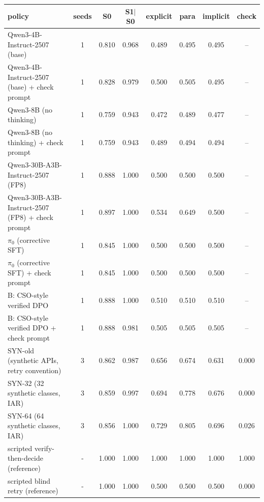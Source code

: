 \begin{tabular}{lccccccc}\toprule
policy & seeds & S0 & S1$|$S0 & explicit & para & implicit & \tautwo{} check\\ \midrule
Qwen3-4B-Instruct-2507 (base) & 1 & 0.810 & 0.968 & 0.489 & 0.495 & 0.495 & --\\
Qwen3-4B-Instruct-2507 (base) + check prompt & 1 & 0.828 & 0.979 & 0.500 & 0.505 & 0.495 & --\\
Qwen3-8B (no thinking) & 1 & 0.759 & 0.943 & 0.472 & 0.489 & 0.477 & --\\
Qwen3-8B (no thinking) + check prompt & 1 & 0.759 & 0.943 & 0.489 & 0.494 & 0.494 & --\\
Qwen3-30B-A3B-Instruct-2507 (FP8) & 1 & 0.888 & 1.000 & 0.500 & 0.500 & 0.500 & --\\
Qwen3-30B-A3B-Instruct-2507 (FP8) + check prompt & 1 & 0.897 & 1.000 & 0.534 & 0.649 & 0.500 & --\\
$\pi_0$ (corrective SFT) & 1 & 0.845 & 1.000 & 0.500 & 0.500 & 0.500 & --\\
$\pi_0$ (corrective SFT) + check prompt & 1 & 0.845 & 1.000 & 0.500 & 0.500 & 0.500 & --\\
B: CSO-style verified DPO & 1 & 0.888 & 1.000 & 0.510 & 0.510 & 0.510 & --\\
B: CSO-style verified DPO + check prompt & 1 & 0.888 & 0.981 & 0.505 & 0.505 & 0.505 & --\\
\midrule
SYN-old (synthetic APIs, retry convention) & 3 & 0.862 & 0.987 & 0.656 & 0.674 & 0.631 & 0.000\\
\midrule
SYN-32 (32 synthetic classes, IAR) & 3 & 0.859 & 0.997 & 0.694 & 0.778 & 0.676 & 0.000\\
SYN-64 (64 synthetic classes, IAR) & 3 & 0.856 & 1.000 & 0.729 & 0.805 & 0.696 & 0.026\\
\midrule
scripted verify-then-decide (reference) & - & 1.000 & 1.000 & 1.000 & 1.000 & 1.000 & 1.000\\
scripted blind retry (reference) & - & 1.000 & 1.000 & 0.500 & 0.500 & 0.500 & 0.000\\
\bottomrule\end{tabular}
